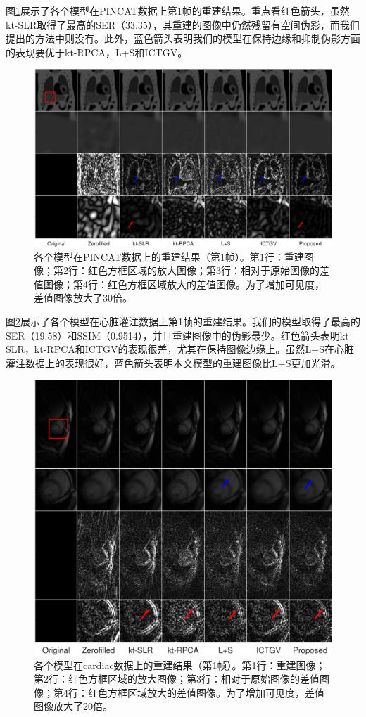 图\ref{fig:pincat}展示了各个模型在PINCAT数据上第1帧的重建结果。重点看红色箭头，虽然kt-SLR取得了最高的SER（33.35），其重建的图像中仍然残留有空间伪影，而我们提出的方法中则没有。此外，蓝色箭头表明我们的模型在保持边缘和抑制伪影方面的表现要优于kt-RPCA，L+S和ICTGV。
\begin{figure}
\centering
\includegraphics[width=1\textwidth]{img/tgvnn/figure2_pincat.eps}
\caption{各个模型在PINCAT数据上的重建结果（第1帧）。第1行：重建图像；第2行：红色方框区域的放大图像；第3行：相对于原始图像的差值图像；第4行：红色方框区域放大的差值图像。为了增加可见度，差值图像放大了30倍。}
\label{fig:pincat}
\end{figure}

图\ref{fig:perfusion}展示了各个模型在心脏灌注数据上第1帧的重建结果。我们的模型取得了最高的SER（19.58）和SSIM（0.9514），并且重建图像中的伪影最少。红色箭头表明kt-SLR，kt-RPCA和ICTGV的表现很差，尤其在保持图像边缘上。虽然L+S在心脏灌注数据上的表现很好，蓝色箭头表明本文模型的重建图像比L+S更加光滑。
\begin{figure}
\centering
\includegraphics[width=1\textwidth]{img/tgvnn/figure3_perfusion.eps}
\caption{各个模型在cardiac数据上的重建结果（第1帧）。第1行：重建图像；第2行：红色方框区域的放大图像；第3行：相对于原始图像的差值图像；第4行：红色方框区域放大的差值图像。为了增加可见度，差值图像放大了20倍。}
\label{fig:perfusion}
\end{figure}

